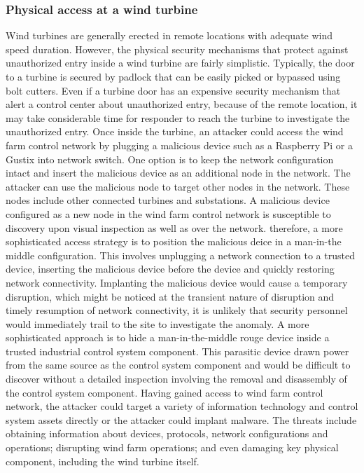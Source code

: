\documentclass[twosided,a4,10pt]{article}
\begin{document}
\begin{multicols}{2}
 \subsubsection{Physical access at a wind turbine}
 Wind turbines are generally erected in remote locations with adequate wind speed duration. However, the physical security mechanisms that protect against unauthorized entry inside a wind turbine are fairly simplistic. Typically, the door to a turbine is secured by padlock that can be easily picked or bypassed using bolt cutters. Even if a turbine door has an expensive security mechanism that alert a control center about unauthorized entry, because of the remote location, it may take considerable time for responder to reach the turbine to investigate the unauthorized entry.
 \newline
Once inside the turbine, an attacker could access the wind farm control network by plugging a malicious device such as a Raspberry Pi or a Gustix into network switch. One option is to keep the network configuration intact and insert the malicious device as an additional node in the network. The attacker can use the malicious node to target other nodes in the network. These nodes include other connected turbines and substations. A malicious device configured as a new node in the wind farm control network is susceptible to discovery upon visual inspection as well as over the network. therefore, a more sophisticated access strategy is to position the malicious deice in a man-in-the middle configuration. This involves unplugging a network connection to a trusted device, inserting the malicious device before the device and quickly restoring network connectivity. Implanting the malicious device would cause a temporary disruption, which might be noticed at the transient nature of disruption and timely resumption of network connectivity, it is unlikely that security personnel would immediately trail to the site to investigate the anomaly. A more sophisticated approach is to hide a man-in-the-middle rouge device inside a trusted industrial control system component. This parasitic device drawn power from the same source as the control system component and would be difficult to discover without a detailed inspection involving the removal and disassembly of the control system component. Having gained access to wind farm control network, the attacker could target a variety of information technology and control system assets directly or the attacker could implant malware. The threats include obtaining information about devices, protocols, network configurations and operations; disrupting wind farm operations; and even damaging key physical component, including the wind turbine itself.

\end{multicols}
\end{document}
